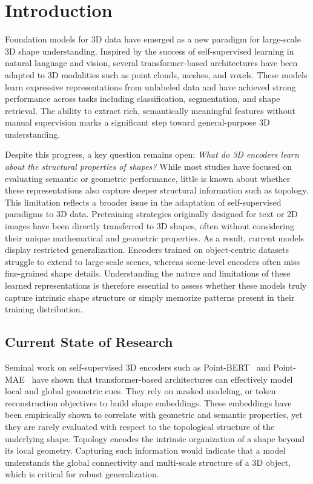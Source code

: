 \section{Introduction}
\label{sec:intro}


Foundation models for 3D data have emerged as a new paradigm for large-scale 3D shape understanding. Inspired by the success of self-supervised learning in natural language and vision, several transformer-based architectures have been adapted to 3D modalities such as point clouds, meshes, and voxels. These models learn expressive representations from unlabeled data and have achieved strong performance across tasks including classification, segmentation, and shape retrieval. The ability to extract rich, semantically meaningful features without manual supervision marks a significant step toward general-purpose 3D understanding.

Despite this progress, a key question remains open: \textit{What do 3D encoders learn about the structural properties of shapes?} While most studies have focused on evaluating semantic or geometric performance, little is known about whether these representations also capture deeper structural information such as topology. This limitation reflects a broader issue in the adaptation of self-supervised paradigms to 3D data. Pretraining strategies originally designed for text or 2D images have been directly transferred to 3D shapes, often without considering their unique mathematical and geometric properties. As a result, current models display restricted generalization. Encoders trained on object-centric datasets struggle to extend to large-scale scenes, whereas scene-level encoders often miss fine-grained shape details. Understanding the nature and limitations of these learned representations is therefore essential to assess whether these models truly capture intrinsic shape structure or simply memorize patterns present in their training distribution.

\subsection{Current State of Research}

Seminal work on self-supervised 3D encoders such as Point-BERT~\cite{pbert} and Point-MAE~\cite{pmae} have shown that transformer-based architectures can effectively model local and global geometric cues. They rely on masked modeling, or token reconstruction objectives to build shape embeddings. These embeddings have been empirically shown to correlate with geometric and semantic properties, yet they are rarely evaluated with respect to the topological structure of the underlying shape. Topology encodes the intrinsic organization of a shape beyond its local geometry. Capturing such information would indicate that a model understands the global connectivity and multi-scale structure of a 3D object, which is critical for robust generalization.

